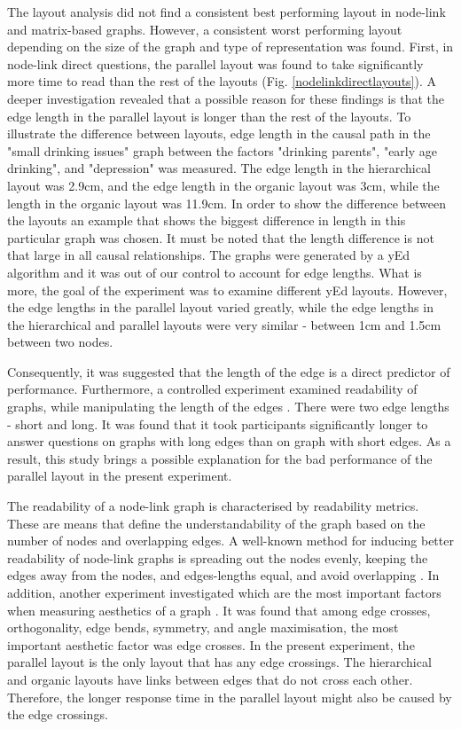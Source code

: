 \documentclass{l4proj}
\begin{document}
The layout analysis did not find a consistent best performing layout in node-link and matrix-based graphs. However, a consistent worst performing layout depending on the size of the graph and type of representation was found. First, in node-link direct questions, the parallel layout was found to take significantly more time to read than the rest of the layouts (Fig.  \ref{nodelinkdirectlayouts}). A deeper investigation revealed that a possible reason for these findings is that the edge length in the parallel layout is longer than the rest of the layouts. To illustrate the difference between layouts, edge length in the causal path in the "small drinking issues" graph between the factors "drinking parents", "early age drinking", and "depression" was measured. The edge length in the hierarchical layout was 2.9cm, and the edge length in the organic layout was 3cm, while the length in the organic layout was 11.9cm. In order to show the difference between the layouts an example that shows the biggest difference in length in this particular graph was chosen. It must be noted that the length difference is not that large in all causal relationships. The graphs were generated by a yEd algorithm and it was out of our control to account for edge lengths. What is more, the goal of the experiment was to examine different yEd layouts. However, the edge lengths in the parallel layout varied greatly, while the edge lengths in the hierarchical and parallel layouts were very similar - between 1cm and 1.5cm between two nodes. 

Consequently, it was suggested that the length of the edge is a direct predictor of performance. Furthermore, a controlled experiment examined readability of graphs, while manipulating the length of the edges \cite{holten2011extended}. There were two edge lengths - short and long. It was found that it took participants significantly longer to answer questions on graphs with long edges than on graph with short edges. As a result, this study brings a possible explanation for the bad performance of the parallel layout in the present experiment.

The readability of a node-link graph is characterised by readability metrics. These are means that define the understandability of the graph based on the number of nodes and overlapping edges. A well-known method for inducing better readability of node-link graphs is spreading out the nodes evenly, keeping the edges away from the nodes, and edges-lengths equal, and avoid overlapping \cite{dunne2015readability}. In addition, another experiment investigated which are the most important factors when measuring aesthetics of a graph \cite{purchase1997aesthetic}. It was found that among edge crosses, orthogonality, edge bends, symmetry, and angle maximisation, the most important aesthetic factor was edge crosses. In the present experiment, the parallel layout is the only layout that has any edge crossings. The hierarchical and organic layouts have links between edges that do not cross each other. Therefore, the longer response time in the parallel layout might also be caused by the edge crossings.
\end{document}
